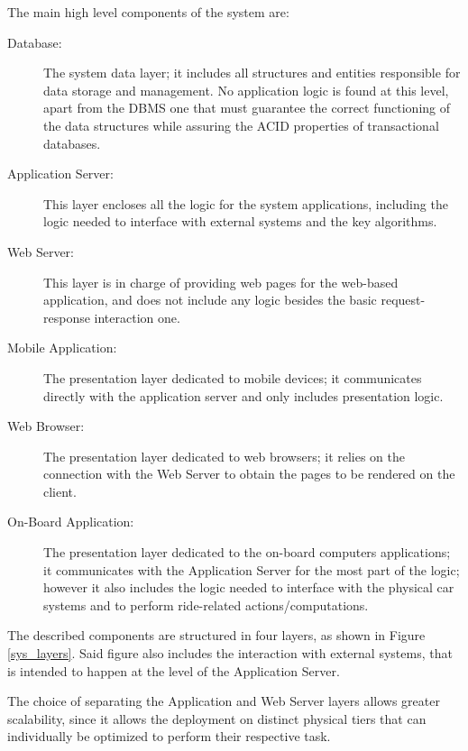The main high level components of the system are:

\begin{description}
\item[Database:] The system data layer; it includes all structures and entities responsible for data storage and management. No application logic is found at this level, apart from the DBMS one that must guarantee the correct functioning of the data structures while assuring the ACID properties of transactional databases.
\item[Application Server:] This layer encloses all the logic for the system applications, including the logic needed to interface with external systems and the key algorithms.
\item[Web Server:] This layer is in charge of providing web pages for the web-based application, and does not include any logic besides the basic request-response interaction one.
\item[Mobile Application:] The presentation layer dedicated to mobile devices; it communicates directly with the application server and only includes presentation logic.
\item[Web Browser:] The presentation layer dedicated to web browsers; it relies on the connection with the Web Server to obtain the pages to be rendered on the client.
\item[On-Board Application:] The presentation layer dedicated to the on-board computers applications; it communicates with the Application Server for the most part of the logic; however it also includes the logic needed to interface with the physical car systems and to perform ride-related actions/computations.
\end{description}

The described components are structured in four layers, as shown in Figure \ref{sys_layers}. Said figure also includes the interaction with external systems, that is intended to happen at the level of the Application Server.

The choice of separating the Application and Web Server layers allows greater scalability, since it allows the deployment on distinct physical tiers that can individually be optimized to perform their respective task.

